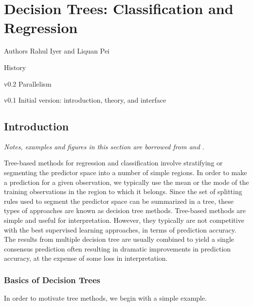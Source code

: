 
\chapter[Decision trees]{Decision Trees: Classification and Regression}
\begin{moduleinfo}
\item[Authors] {Rahul Iyer and Liquan Pei}
\item[History]
    \begin{modulehistory}
            \item[v0.2] Parallelism
            \item[v0.1] Initial version: introduction, theory, and interface
    \end{modulehistory}
\end{moduleinfo}

\section{Introduction} %
\label{sec:introduction}


\emph{Notes, examples and figures in this section are borrowed from
\cite{hastie2008statisticallearning} and \cite{james2013statisticallearning}}.


Tree-based methods for regression and classification involve stratifying or
segmenting the predictor space into a number of simple regions. In order to make
a prediction for a given observation, we typically use the mean or the mode of
the training observations in the region to which it belongs. Since the set of
splitting rules used to segment the predictor space can be summarized in a tree,
these types of approaches are known as decision tree methods. Tree-based methods
are simple and useful for interpretation. However, they typically are not
competitive with the best supervised learning approaches, in terms of
prediction accuracy. The results from multiple decision tree are usually combined
to yield a single consensus prediction often resulting in dramatic improvements
in prediction accuracy, at the expense of some loss in interpretation.

\subsection{Basics of Decision Trees} %
\label{sub:basics_of_decision_trees}
In order to motivate tree methods, we begin with a simple example.

